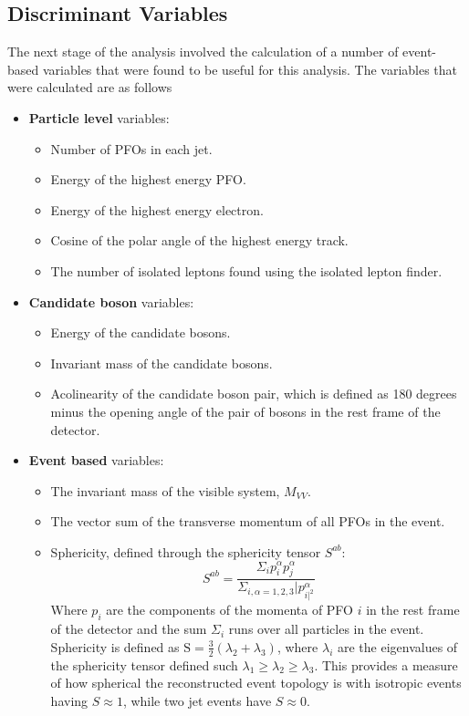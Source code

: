 
\subsection{Discriminant Variables} 
\label{sec:analysisprocessor}
The next stage of the analysis involved the calculation of a number of event-based variables that were found to be useful for this analysis.  The variables that were calculated are as follows

\begin{itemize}
\item \textbf{Particle level} variables:

\begin{itemize}
\item Number of PFOs in each jet.
\item Energy of the highest energy PFO.
\item Energy of the highest energy electron.
\item Cosine of the polar angle of the highest energy track.
\item The number of isolated leptons found using the isolated lepton finder.
\end{itemize}

\item \textbf{Candidate boson} variables:

\begin{itemize}
\item Energy of the candidate bosons.
\item Invariant mass of the candidate bosons.
\item Acolinearity of the candidate boson pair, which is defined as 180 degrees minus the opening angle of the pair of bosons in the rest frame of the detector.
\end{itemize}

\item \textbf{Event based} variables:  

\begin{itemize}
\item The invariant mass of the visible system, $M_{VV}$.
\item The vector sum of the transverse momentum of all PFOs in the event. 
\item Sphericity, defined through the sphericity tensor $S^{ab}$:
\begin{equation}
S^{ab} = \frac{\Sigma_{i}p^{\alpha}_{i}p^{\alpha}_{j}}{\Sigma_{i,\alpha=1,2,3}|p^{\alpha}_{i|^{2}}}
\end{equation}
Where $p_{i}$ are the components of the momenta of PFO $i$ in the rest frame of the detector and the sum $\Sigma_{i}$ runs over all particles in the event.  Sphericity is defined as $\text{S} = \frac{3}{2}(\lambda_{2} + \lambda_{3})$, where $\lambda_{i}$ are the eigenvalues of the sphericity tensor defined such $\lambda_{1} \geq \lambda_{2} \geq \lambda_{3}$.  This provides a measure of how spherical the reconstructed event topology is with isotropic events having $S \approx 1$, while two jet events have $S \approx 0$.
\end{itemize}


\end{itemize}
